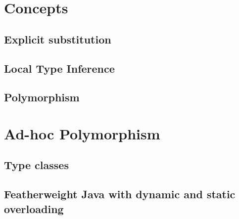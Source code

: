\documentclass{article}
\begin{document}
\section{Concepts}\label{section:concepts}
\subsection{Explicit substitution}
\subsection{Local Type Inference}
\subsection{Polymorphism}
\section{Ad-hoc Polymorphism}\label{section:polymorphism}
\subsection{Type classes}
\subsection{Featherweight Java with dynamic and static overloading}

\medskip 


\end{document}
